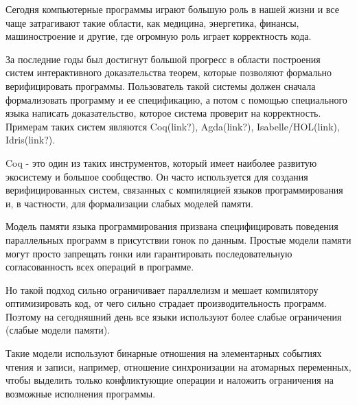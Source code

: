 \documentclass[times
              ]{itmo-student-thesis}
\begin{document}

\tableofcontents

\startprefacepage



Сегодня компьютерные программы играют большую роль в нашей жизни и все чаще затрагивают такие области, как медицина, энергетика, финансы, машиностроение и другие, где огромную роль играет корректность кода.

За последние годы был достигнут большой прогресс в области построения систем интерактивного доказательства теорем, которые позволяют формально верифицировать программы.
Пользователь такой системы должен сначала формализовать программу и ее спецификацию, а потом с помощью специального языка написать доказательство, которое система проверит на корректность.
Примерам таких систем являются Coq(link?), Agda(link?), Isabelle/HOL(link), Idris(link?).

Coq - это один из таких инструментов, который имеет наиболее развитую экосистему и большое сообщество.
Он часто используется для создания верифицированных систем, связанных с компиляцией языков программирования\cite{comp-cert, vellvm} и, в частности, для формализации слабых моделей памяти\cite{rc11, imm}.

Модель памяти языка программирования призвана специфицировать поведения параллельных программ в присутствии гонок по данным.
Простые модели памяти могут просто запрещать гонки или гарантировать последовательную согласованность всех операций в программе.

Но такой подход сильно ограничивает параллелизм и мешает компилятору оптимизировать код, от чего сильно страдает производительность программ.
Поэтому на сегодняшний день все языки используют более слабые ограничения (слабые модели памяти).

Такие модели используют бинарные отношения на элементарных событиях чтения и записи, например, отношение синхронизации на атомарных переменных, чтобы выделить только конфликтующие операции и наложить ограничения на возможные исполнения программы.
\end{document}
